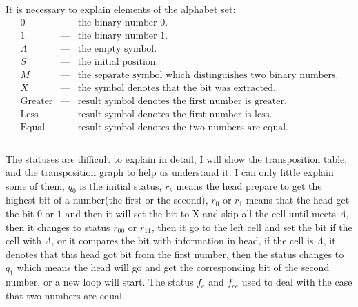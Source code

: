 \documentclass[a4papper]{article}
\theoremstyle{neosn}
\begin{document}
    It is necessary to explain elements of the alphabet set: \\
    \[
    \begin{array}{lll}
        0 & \text{---} & \text{the binary number 0.}\\
        1 & \text{---} & \text{the binary number 1.}\\
        \Lambda & \text{---} & \text{the empty symbol.}\\
        S & \text{---} & \text{the initial position.}\\
        M & \text{---} & \text{the separate symbol which distinguishes two binary numbers.}\\
        X & \text{---} & \text{the symbol denotes that the bit was extracted.}\\
        \text{Greater} & \text{---} & \text{result symbol denotes the first number is greater.}\\
        \text{Less} & \text{---} & \text{result symbol denotes the first number is less.}\\
        \text{Equal} & \text{---} & \text{result symbol denotes the two numbers are equal.}\\
    \end{array}
    \] \\

    The statuses are difficult to explain in detail, I will show the transposition table, and the transposition graph to help us understand it.
    I can only little explain some of them, $q_0$ is the initial status, $r_s$ means the head prepare to get the highest bit of a number(the first or the second),
    $r_0$ or $r_1$ means that the head get the bit $0$ or $1$ and then it will set the bit to X and skip all the cell until meets $\Lambda$, then it changes to status
    $r_{00}$ or $r_{11}$, then it go to the left cell and set the bit if the cell with $\Lambda$, or it compares the bit with information in head, if the cell is $\Lambda$,
    it denotes that this head got bit from the first number, then the status changes to $q_1$ which means the head will go and get the corresponding bit of the second number, or
    a new loop will start. The status $f_e$ and $f_{ee}$ used to deal with the case that two numbers are equal.\\
\end{document}
